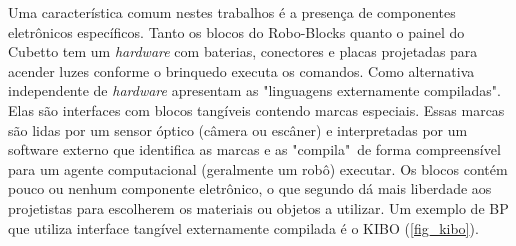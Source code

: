 Uma característica comum nestes trabalhos é a presença de componentes eletrônicos específicos. Tanto os blocos do Robo-Blocks quanto o painel do Cubetto tem um \textit{hardware} com baterias, conectores e placas projetadas para acender luzes conforme o brinquedo executa os comandos. Como alternativa independente de \textit{hardware}  apresentam as "linguagens externamente compiladas". Elas são interfaces com blocos tangíveis contendo marcas especiais. Essas marcas são lidas por um sensor óptico (câmera ou escâner) e interpretadas por um software externo que identifica as marcas e as "compila"\ de forma compreensível para um agente computacional (geralmente um robô) executar. Os blocos contém pouco ou nenhum componente eletrônico, o que segundo  dá mais liberdade aos projetistas para escolherem os materiais ou objetos a utilizar. Um exemplo de BP que utiliza interface tangível externamente compilada é o KIBO \cite{sullivan_kibo_2015} (\autoref{fig_kibo}).

